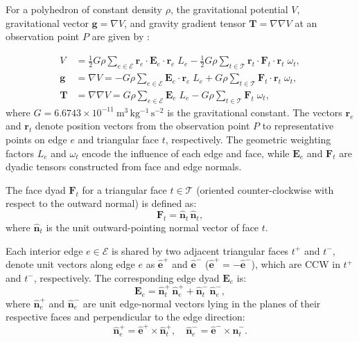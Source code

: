 \documentclass{seg}
\begin{document}
For a polyhedron of constant density $\rho$, the gravitational potential $V$, gravitational vector $\mathbf{g} = \nabla V$, and gravity gradient tensor $\mathbf{T} = \nabla \nabla V$ at an observation point $P$ are given by \citet{Werner1996CelestialMechDynAstr}:

\begin{align}
V &= \frac{1}{2} G \rho \sum_{e \in \mathcal{E}} \mathbf{r}_e \cdot \mathbf{E}_e \cdot  
                         \mathbf{r}_e \; L_e 
    -\frac{1}{2} G \rho \sum_{t \in \mathcal{T}} \mathbf{r}_t \cdot \mathbf{F}_t \cdot   
                         \mathbf{r}_t \; \omega_t, \tag{1} \\
\mathbf{g} &= \nabla V = -G \rho \sum_{e \in \mathcal{E}} \mathbf{E}_e \cdot \mathbf{r}_e \; L_e 
           + G \rho \sum_{t \in \mathcal{T}} \mathbf{F}_t \cdot \mathbf{r}_t \; \omega_t, \tag{2} \\
\mathbf{T} &= \nabla \nabla V = G \rho \sum_{e \in \mathcal{E}} \mathbf{E}_e \; L_e 
                 - G \rho \sum_{t \in \mathcal{T}} \mathbf{F}_t \; \omega_t, \tag{3}
\end{align}
where $G = 6.6743 \times 10^{-11}~\mathrm{m^3\,kg^{-1}\,s^{-2}}$ is the gravitational constant. The vectors $\mathbf{r}_e$ and $\mathbf{r}_t$ denote position vectors from the observation point $P$ to representative points on edge $e$ and triangular face $t$, respectively. The geometric weighting factors $L_e$ and $\omega_t$ encode the influence of each edge and face, while $\mathbf{E}_e$ and $\mathbf{F}_t$ are dyadic tensors constructed from face and edge normals.

The face dyad $\mathbf{F}_t$ for a triangular face $t \in \mathcal{T}$ (oriented counter-clockwise with respect to the outward normal) is defined as:
\begin{equation}
\mathbf{F}_t = \hat{\mathbf{n}}_{t} \, \hat{\mathbf{n}}_{t}, \tag{4}
\end{equation}
where $\hat{\mathbf{n}}_{t}$ is the unit outward-pointing normal vector of face $t$.

Each interior edge $e \in \mathcal{E}$ is shared by two adjacent triangular faces $t^{+}$ and $t^{-}$, denote unit vectors along edge $e$ as $\hat{\mathbf{e}}^{+}$ and $\hat{\mathbf{e}}^{-}$ ($\hat{\mathbf{e}}^{+} = - \hat{\mathbf{e}}^{-}$), which are CCW in $t^{+}$ and $t^{-}$, respectively. The corresponding edge dyad $\mathbf{E}_e$ is:
\begin{equation}
\mathbf{E}_{e} = \hat{\mathbf{n}}_{t}^{+} \, \hat{\mathbf{n}}_{e}^{+} + \hat{\mathbf{n}}_{t}^{-} \, \hat{\mathbf{n}}_{e}^{-}, \tag{5}
\end{equation}
where $\hat{\mathbf{n}}_{e}^{+}$ and $\hat{\mathbf{n}}_{e}^{-}$ are unit edge-normal vectors lying in the planes of their respective faces and perpendicular to the edge direction:
\[
\hat{\mathbf{n}}_{e}^{+} = \hat{\mathbf{e}}^{+} \times \hat{\mathbf{n}}_{t}^{+}, \quad
\hat{\mathbf{n}}_{e}^{-} = \hat{\mathbf{e}}^{-} \times \hat{\mathbf{n}}_{t}^{-}.
\]
\end{document}
